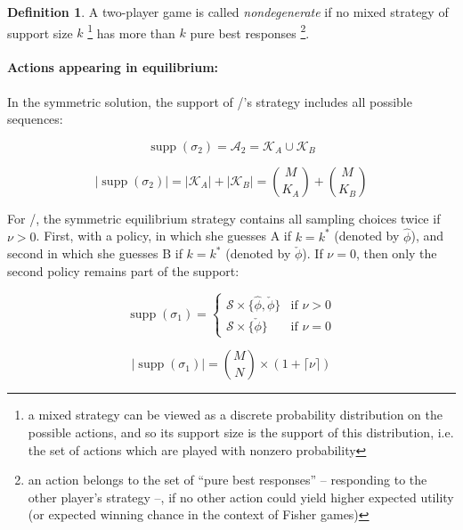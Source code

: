 \documentclass{article}
\theoremstyle{definition}
\newtheorem{definition}{Definition}[section]
\DeclareMathOperator\supp{supp}
\begin{document}
\begin{definition}
A two-player game is called \emph{nondegenerate} if no mixed strategy
of support size $k$ \footnote{a mixed strategy can be viewed as a discrete probability distribution on the possible actions, and so its support size is the support of this distribution, i.e. the set of actions which are played with nonzero probability} has more than $k$ pure best responses \footnote{an action belongs to the set of ``pure best responses'' -- responding to the other player's strategy --, if no other action could yield higher expected utility (or expected winning chance in the context of Fisher games)}. \cite{book:AlgorithmicGameTheory}

\end{definition}

\paragraph{Actions appearing in equilibrium:}

In the symmetric solution, the support of \PII/'s strategy includes all possible sequences:

\begin{equation}
    \supp(\sigma_2) = \mathcal{A}_2 = \mathcal{K}_A \cup \mathcal{K}_B
\end{equation}

\begin{equation}
    |\supp(\sigma_2)| = |\mathcal{K}_A| + |\mathcal{K}_B| = \binom{M}{K_A} + \binom{M}{K_B}
\end{equation}

For \PI/, the symmetric equilibrium strategy contains all sampling choices twice if $\nu > 0$. First, with a policy, in which she guesses A if $k=k^*$ (denoted by $\hat{\phi}$), and second in which she guesses B if $k=k^*$ (denoted by $\check{\phi}$). If $\nu = 0$, then only the second policy remains part of the support:

\begin{equation}
        \supp(\sigma_1)=
        \begin{cases}
        \mathcal{S} \times \{\hat{\phi}, \check{\phi} \} & \text{if } \nu > 0 \\
        \mathcal{S} \times \{\check{\phi} \} & \text{if } \nu = 0
    \end{cases}
\end{equation}

\begin{equation}
    |\supp(\sigma_1)| = \binom{M}{N} \times (1 + \lceil \nu \rceil)
\end{equation}
\end{document}
